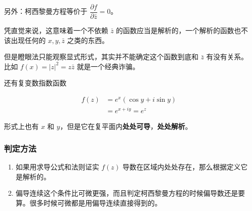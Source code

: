 \begin{tcolorbox}[title={Note},colback=red!5!white
,colframe=red!75!black
,colbacktitle=yellow!50!red
,coltitle=red!25!black, fonttitle=\bfseries,subtitle style={boxrule=0.4pt, colback=yellow!50!red!25!white}]
另外：柯西黎曼方程等价于
\(\dfrac{\partial f}{\partial \bar{z}}=0\)。

凭直觉来说，这意味着一个不依赖 \(\bar{z}\) 的函数应当是解析的，一个解析的函数也不该出现任何的 \(x,y,\bar{z}\) 之类的东西。

但是瞪眼法只能观察显式形式，其实并不能确定这个函数到底和 \(\bar{z}\) 有没有关系。比如 \(f(x)=|z|^2=z\bar{z}\) 就是一个经典诈骗。

还有复变数指数函数

\begin{equation*}
\begin{aligned}
    f(z)&=e^x(\cos y+i\sin y)\\
    &=e^{x+iy}=e^z
\end{aligned}
\end{equation*}

形式上也有 \(x\) 和 \(y\)，但是它在复平面内\textbf{处处可导}，\textbf{处处解析}。

\end{tcolorbox}
\subsubsection{判定方法}
\label{判定方法}
\begin{enumerate}
\item 如果用求导公式和法则证实 \(f(z)\)
导数在区域内处处存在，那么根据定义它是解析的。
\item 偏导连续这个条件比可微更强，而且判定柯西黎曼方程的时候偏导数还是要算。很多时候可微都是用偏导连续直接得到的。
\end{enumerate}

